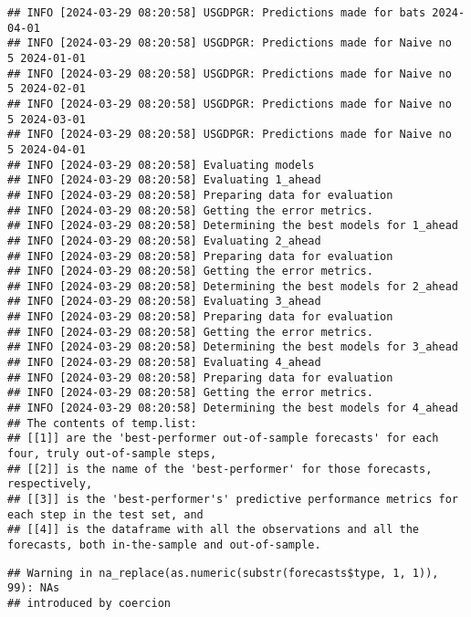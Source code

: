 \documentclass[
]{article}
\begin{document}
\begin{verbatim}
## INFO [2024-03-29 08:20:58] USGDPGR: Predictions made for bats 2024-04-01
## INFO [2024-03-29 08:20:58] USGDPGR: Predictions made for Naive no  5 2024-01-01
## INFO [2024-03-29 08:20:58] USGDPGR: Predictions made for Naive no  5 2024-02-01
## INFO [2024-03-29 08:20:58] USGDPGR: Predictions made for Naive no  5 2024-03-01
## INFO [2024-03-29 08:20:58] USGDPGR: Predictions made for Naive no  5 2024-04-01
## INFO [2024-03-29 08:20:58] Evaluating models
## INFO [2024-03-29 08:20:58] Evaluating 1_ahead
## INFO [2024-03-29 08:20:58] Preparing data for evaluation
## INFO [2024-03-29 08:20:58] Getting the error metrics.
## INFO [2024-03-29 08:20:58] Determining the best models for 1_ahead
## INFO [2024-03-29 08:20:58] Evaluating 2_ahead
## INFO [2024-03-29 08:20:58] Preparing data for evaluation
## INFO [2024-03-29 08:20:58] Getting the error metrics.
## INFO [2024-03-29 08:20:58] Determining the best models for 2_ahead
## INFO [2024-03-29 08:20:58] Evaluating 3_ahead
## INFO [2024-03-29 08:20:58] Preparing data for evaluation
## INFO [2024-03-29 08:20:58] Getting the error metrics.
## INFO [2024-03-29 08:20:58] Determining the best models for 3_ahead
## INFO [2024-03-29 08:20:58] Evaluating 4_ahead
## INFO [2024-03-29 08:20:58] Preparing data for evaluation
## INFO [2024-03-29 08:20:58] Getting the error metrics.
## INFO [2024-03-29 08:20:58] Determining the best models for 4_ahead
## The contents of temp.list:
## [[1]] are the 'best-performer out-of-sample forecasts' for each four, truly out-of-sample steps,
## [[2]] is the name of the 'best-performer' for those forecasts, respectively,
## [[3]] is the 'best-performer's' predictive performance metrics for each step in the test set, and
## [[4]] is the dataframe with all the observations and all the forecasts, both in-the-sample and out-of-sample.
\end{verbatim}

\begin{verbatim}
## Warning in na_replace(as.numeric(substr(forecasts$type, 1, 1)), 99): NAs
## introduced by coercion
\end{verbatim}
\end{document}
